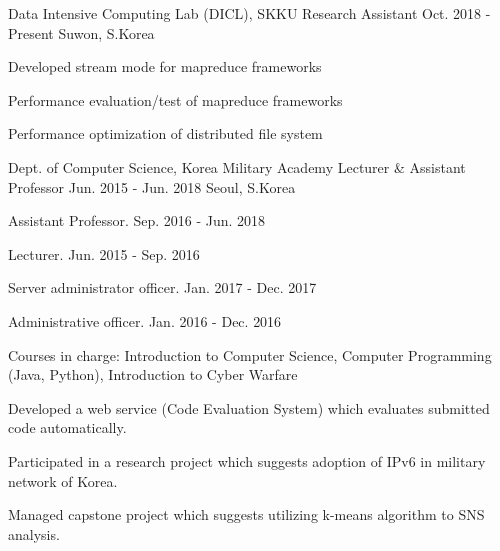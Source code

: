 


\begin{cventries}


\cventry
{Data Intensive Computing Lab (DICL), SKKU} %
{Research Assistant} %
{Oct. 2018 -  Present} %
{Suwon, S.Korea} %
{ %
\begin{cvitems}
\item {Developed stream mode for mapreduce frameworks}
\item {Performance evaluation/test of mapreduce frameworks}
\item {Performance optimization of distributed file system}
\end{cvitems}
}


\cventry
{Dept. of Computer Science, Korea Military Academy} %
{Lecturer \& Assistant Professor} %
{Jun. 2015 -  Jun. 2018} %
{Seoul, S.Korea} %
{ %
\begin{cvitems}
\item {Assistant Professor. Sep. 2016 - Jun. 2018}
\item {Lecturer. Jun. 2015 - Sep. 2016}
\item {Server administrator officer. Jan. 2017 - Dec. 2017}
\item {Administrative officer. Jan. 2016 - Dec. 2016}
\item {Courses in charge: Introduction to Computer Science, Computer Programming (Java, Python), Introduction to Cyber Warfare}
\item {Developed a web service (Code Evaluation System) which evaluates submitted code automatically.}
\item {Participated in a research project which suggests adoption of IPv6 in military network of Korea.}
\item {Managed capstone project which suggests utilizing k-means algorithm to SNS analysis.}
\end{cvitems}
}


\end{cventries}
